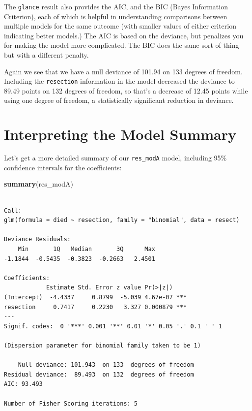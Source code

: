 \documentclass[]{book}
\newenvironment{Shaded}{\begin{snugshade}}{\end{snugshade}}
\newcommand{\KeywordTok}[1]{\textcolor[rgb]{0.13,0.29,0.53}{\textbf{#1}}}
\newcommand{\NormalTok}[1]{#1}
\theoremstyle{definition}
\theoremstyle{definition}
\theoremstyle{definition}
\theoremstyle{remark}
\begin{document}
The \texttt{glance} result also provides the AIC, and the BIC (Bayes
Information Criterion), each of which is helpful in understanding
comparisons between multiple models for the same outcome (with smaller
values of either criterion indicating better models.) The AIC is based
on the deviance, but penalizes you for making the model more
complicated. The BIC does the same sort of thing but with a different
penalty.

Again we see that we have a null deviance of 101.94 on 133 degrees of
freedom. Including the \texttt{resection} information in the model
decreased the deviance to 89.49 points on 132 degrees of freedom, so
that's a decrease of 12.45 points while using one degree of freedom, a
statistically significant reduction in deviance.

\section{Interpreting the Model
Summary}\label{interpreting-the-model-summary}

Let's get a more detailed summary of our \texttt{res\_modA} model,
including 95\% confidence intervals for the coefficients:

\begin{Shaded}
\begin{Highlighting}[]
\KeywordTok{summary}\NormalTok{(res_modA)}
\end{Highlighting}
\end{Shaded}

\begin{verbatim}

Call:
glm(formula = died ~ resection, family = "binomial", data = resect)

Deviance Residuals: 
    Min       1Q   Median       3Q      Max  
-1.1844  -0.5435  -0.3823  -0.2663   2.4501  

Coefficients:
            Estimate Std. Error z value Pr(>|z|)    
(Intercept)  -4.4337     0.8799  -5.039 4.67e-07 ***
resection     0.7417     0.2230   3.327 0.000879 ***
---
Signif. codes:  0 '***' 0.001 '**' 0.01 '*' 0.05 '.' 0.1 ' ' 1

(Dispersion parameter for binomial family taken to be 1)

    Null deviance: 101.943  on 133  degrees of freedom
Residual deviance:  89.493  on 132  degrees of freedom
AIC: 93.493

Number of Fisher Scoring iterations: 5
\end{verbatim}
\end{document}
